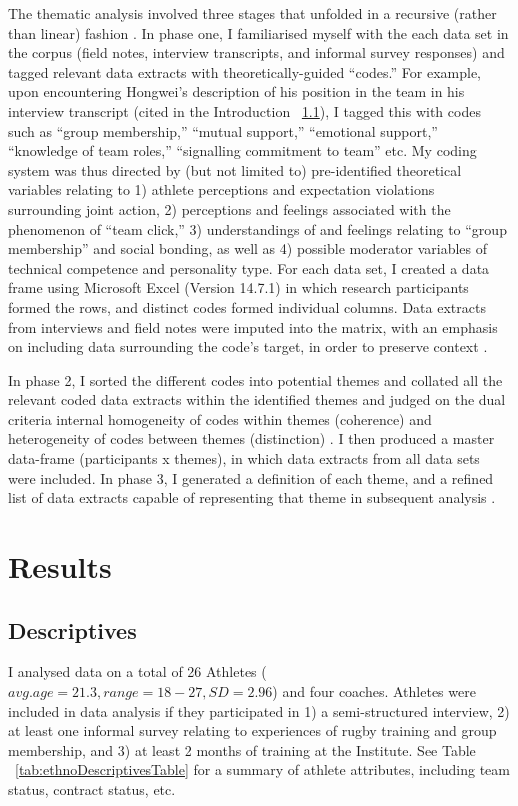 The thematic analysis involved three stages that unfolded in a recursive (rather than linear) fashion \citep{Braun2006}. In phase one, I familiarised myself with the each data set in the corpus (field notes, interview transcripts, and informal survey responses) and tagged relevant data extracts with theoretically-guided ``codes.'' For example, upon encountering Hongwei's description of his position in the team in his interview transcript (cited in the Introduction ~\ref{}), I tagged this with codes such as ``group membership,'' ``mutual support,'' ``emotional support,'' ``knowledge of team roles,'' ``signalling commitment to team'' etc.  My coding system was thus directed by (but not limited to) pre-identified theoretical variables relating to 1) athlete perceptions and expectation violations surrounding joint action, 2) perceptions and feelings associated with the phenomenon of ``team click,'' 3) understandings of and feelings relating to ``group membership'' and social bonding, as well as 4) possible moderator variables of technical competence and personality type.  For each data set, I created a data frame using Microsoft Excel (Version 14.7.1) in which research participants formed the rows, and distinct codes formed individual columns. Data extracts from interviews and field notes were imputed into the matrix, with an emphasis on including data surrounding the code's target, in order to preserve context \citep[see][]{Bryman2001}.

In phase 2, I sorted the different codes into potential themes and collated all the relevant coded data extracts within the identified themes and judged on the dual criteria internal homogeneity of codes within themes (coherence) and heterogeneity of codes between themes (distinction) \citep{Patton1990}.  I then produced a master data-frame (participants x themes), in which data extracts from all data sets were included.  In phase 3, I generated a definition of each theme, and a refined list of data extracts capable of representing that theme in subsequent analysis \citep{Braun2006}.






\section{Results}


\subsection{Descriptives}
I analysed data on a total of 26 Athletes ($avg. age = 21.3, range = 18-27, SD = 2.96$) and four coaches.  Athletes were included in data analysis if they participated in 1) a semi-structured interview, 2) at least one informal survey relating to experiences of rugby training and group membership, and 3) at least 2 months of training at the Institute.  See Table ~\ref{tab:ethnoDescriptivesTable} for a summary of athlete attributes, including team status, contract status, etc.

